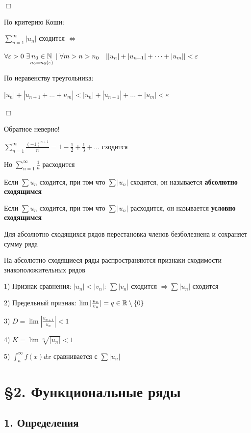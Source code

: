\documentclass[12pt]{article}
\begin{document}
    \begin{MyProof}
        $\Box$

        По критерию Коши:

        $\sum_{n = 1}^\infty |u_n|$ сходится $\Longleftrightarrow$

        $\forall \varepsilon > 0 \ \exists \underset{n_0 = n_0(\varepsilon)}{n_0 \in \mathbb{N}} \ | \ \forall m > n > n_0 \quad ||u_n| + |u_{n + 1}| + \dots + |u_m|| < \varepsilon$

        По неравенству треугольника:

        $|u_n| + |u_{n + 1} + \dots + u_m| < |u_n| + |u_{n + 1}| + \dots + |u_m| < \varepsilon$

        $\Box$
    \end{MyProof}

    \Notas Обратное неверно!

    \Ex $\sum_{n = 1}^\infty \frac{(-1)^{n + 1}}{n} = 1 - \frac{1}{2} + \frac{1}{3} + \dots $ сходится

    Но $\sum_{n = 1}^\infty \frac{1}{n}$ расходится

    \Def Если $\sum u_n$ сходится, при том что $\sum |u_n|$ сходится, он называется \textbf{абсолютно сходящимся}

    \Defs Если $\sum u_n$ сходится, при том что $\sum |u_n|$ расходится, он называется \textbf{условно сходящимся}

    \Notas Для абсолютно сходящихся рядов перестановка членов безболезнена и сохраняет сумму ряда

    \Notas На абсолютно сходящиеся ряды распространяются признаки сходимости знакоположительных рядов

    1) Признак сравнения: $|u_n| < |v_n|: \ \sum |v_n|$ сходится $\Longrightarrow \sum |u_n|$ сходится

    2) Предельный признак: $\lim |\frac{u_n}{v_n}| = q \in \mathbb{R} \setminus \{0\}$

    3) $D = \lim |\frac{u_{n + 1}}{u_n}| < 1$

    4) $K = \lim \sqrt[n]{|{u_n}|} < 1$

    5) $\int_a^\infty f(x)dx$ сравнивается с $\sum |u_n|$

    \clearpage


    \section{\S 2. Функциональные ряды}

    \subsection{1. Определения}
\end{document}
